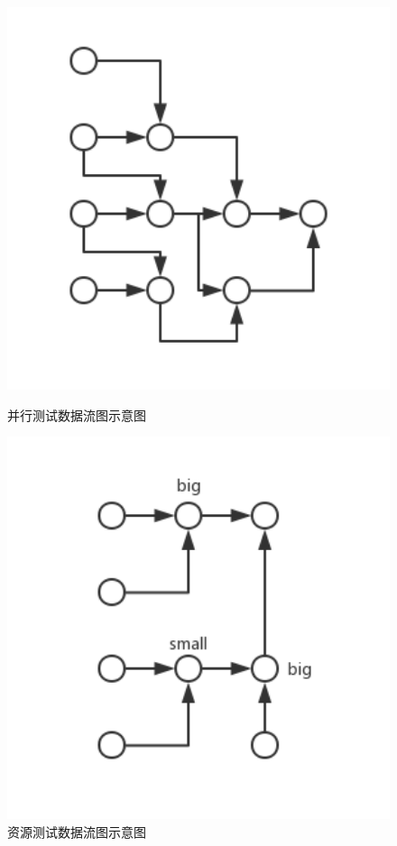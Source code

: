     \begin{figure}[!htbp]
        \centering
        \begin{minipage}[t]{0.4\textwidth}
            \centering
            \includegraphics[width=1\textwidth]{figures/sche_parallel.jpg}
            \caption{并行测试数据流图示意图}
            \label{fig:sche_parallel}
        \end{minipage}
        \begin{minipage}[t]{0.4\textwidth}
            \centering
            \includegraphics[width=1\textwidth]{figures/sche_resource.jpg}
            \caption{资源测试数据流图示意图}
            \label{fig:sche_resource}
        \end{minipage}
    \end{figure}

